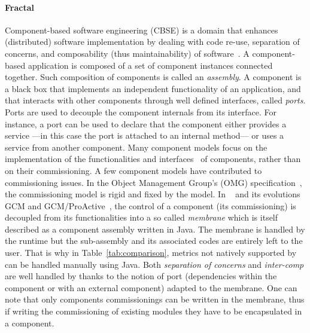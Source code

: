 \paragraph{Fractal}
Component-based software engineering (CBSE) is a domain that enhances
(distributed) software implementation by dealing with code re-use,
separation of concerns, and composability (thus maintainability) of
software~\cite{Szyperski:2002:CSB:515228}. A component-based
application is composed of a set of component instances connected
together. Such composition of components is called an
\emph{assembly}. A component is a black box that implements an
independent functionality of an application, and that interacts with
other components through well defined interfaces, called \emph{ports}.
Ports are used to decouple the component internals from its
interface. For instance, a port can be used to declare that the
component either provides a service ---in this case the port is
attached to an internal method--- or uses a service from another
component. Many component models focus on the implementation of the
functionalities and
interfaces~\cite{corba:omg06,Blair2009,baude:hal-01001043,Bernholdt01052006,bigot:inria-00388508,Coullon2017}
of components, rather than on their commissioning. A few component
models have contributed to commissioning issues. In the Object
Management Group's (OMG) specification~\cite{ccmdeploy:omg06}, the
commissioning model is rigid and fixed by the model. In
\fractal~\cite{Blair2009} and its evolutions GCM and
GCM/ProActive~\cite{baude:hal-01001043}, the control of a component
(\eg its commissioning) is decoupled from its functionalities into a
so called \emph{membrane} which is itself described as a component
assembly written in Java. The membrane is handled by the \fractal
runtime but the sub-assembly and its associated codes are entirely
left to the user. That is why in Table~\ref{tab:comparison}, metrics
not natively supported by \fractal can be handled manually using
Java. Both \emph{separation of concerns} and \emph{inter-comp} are well
handled by \fractal thanks to the notion of port (dependencies within
the component or with an external component) adapted to the
membrane. One can note that only \fractal components commissionings
can be written in the membrane, thus if writing the commissioning of
existing modules they have to be encapsulated in a \fractal component.

